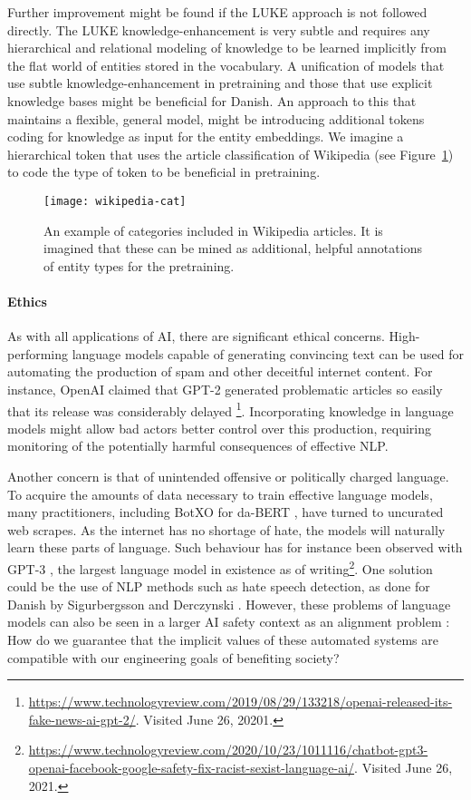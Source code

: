 \documentclass[main.tex]{subfiles}
\begin{document}
Further improvement might be found if the LUKE approach is not followed directly.
The LUKE knowledge-enhancement is very subtle and requires any hierarchical and relational modeling of knowledge to be learned implicitly from the flat world of entities stored in the vocabulary.
A unification of models that use subtle knowledge-enhancement in pretraining and those that use explicit knowledge bases might be beneficial for Danish.
An approach to this that maintains a flexible, general model, might be introducing additional tokens coding for knowledge as input for the entity embeddings.
We imagine a hierarchical token that uses the article classification of Wikipedia (see Figure~\ref{fig:wikipedia-cat}) to code the type of token to be beneficial in pretraining.
\begin{figure}[H]
    \centering
    \texttt{[image: wikipedia-cat]}
    \caption{An example of categories included in Wikipedia articles. It is imagined that these can be mined as additional, helpful annotations of entity types for the pretraining.}
    \label{fig:wikipedia-cat}
\end{figure}\noindent

\paragraph{Ethics}
As with all applications of AI, there are significant ethical concerns.
High-performing language models capable of generating convincing text can be used for automating the production of spam and other deceitful internet content.
For instance, OpenAI claimed that GPT-2 \cite{Radford2019gpt2} generated problematic articles so easily that its release was considerably delayed \footnote{\url{https://www.technologyreview.com/2019/08/29/133218/openai-released-its-fake-news-ai-gpt-2/}. Visited June 26, 20201.}.
Incorporating knowledge in language models might allow bad actors better control over this production, requiring monitoring of the potentially harmful consequences of effective NLP.

Another concern is that of unintended offensive or politically charged language.
To acquire the amounts of data necessary to train effective language models, many practitioners, including BotXO for da-BERT \cite{botxo2019dabert}, have turned to uncurated web scrapes.
As the internet has no shortage of hate, the models will naturally learn these parts of language.
Such behaviour has for instance been observed with GPT-3 \cite{brown2020language}, the largest language model in existence as of writing\footnote{\url{https://www.technologyreview.com/2020/10/23/1011116/chatbot-gpt3-openai-facebook-google-safety-fix-racist-sexist-language-ai/}. Visited June 26, 2021.}.
One solution could be the use of NLP methods such as hate speech detection, as done for Danish by Sigurbergsson and Derczynski \cite{sigurbergsson-derczynski-2020-offensive}.
However, these problems of language models can also be seen in a larger AI safety context as an alignment problem \cite{taylor2020alignment}:
How do we guarantee that the implicit values of these automated systems are compatible with our engineering goals of benefiting society?
\end{document}
